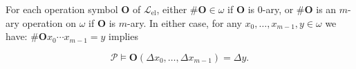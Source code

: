 For each operation symbol $\mathbf{O}$ of $\mathcal{L}_{\text{el}}$, either $\#\mathbf{O} \in \omega$ if $\mathbf{O}$ is $0$-ary, or $\#\mathbf{O}$ is an $m$-ary operation on $\omega$ if $\mathbf{O}$ is $m$-ary. In either case, for any $x_0, \ldots, x_{m-1}, y \in \omega$ we have: $\#\mathbf{O} x_0 \cdots x_{m-1} = y$ implies

$$\mathcal{P} \models \mathbf{O}(\Delta x_0, \ldots, \Delta x_{m-1}) = \Delta y.$$
